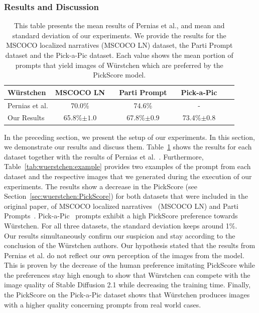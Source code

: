 \subsubsection{Results and Discussion}
\begin{table}[t]
    \caption{This table presents the mean results of Pernias et
        al.\cite{pernias2024wrstchen}, and mean and standard deviation of our
        experiments. We provide the results for the MSCOCO localized narratives
        (MSCOCO LN) dataset, the Parti Prompt dataset and the Pick-a-Pic
        dataset. Each value shows the mean portion of prompts that yield images
        of W\"urstchen which are preferred by the PickScore model.}
    \label{tab:wuerstchen:results}
    \centering
    \begin{tabular}{lccccccc}
        \toprule
        \textbf{W\"urstchen}                     & \textbf{MSCOCO LN}    & \phantom{0} & \textbf{Parti Prompt} & \phantom{0} & \textbf{Pick-a-Pic}   \\
        \midrule
        Pernias et al.\cite{pernias2024wrstchen} & 70.0\%                & \phantom{0} & 74.6\%                & \phantom{0} & -                     \\
        Our Results                              & 65.8\%{\tiny$\pm1.0$} & \phantom{0} & 67.8\%{\tiny$\pm0.9$} & \phantom{0} & 73.4\%{\tiny$\pm0.8$} \\
        \bottomrule
    \end{tabular}
\end{table}
In the preceding section, we present the setup of our experiments. In this
section, we demonstrate our results and discuss them.
Table~\ref{tab:wuerstchen:results} shows the results for each dataset together
with the results of Pernias et al.~\cite{pernias2024wrstchen}. Furthermore,
Table~\ref{tab:wuerstchen:example} provides two examples of the prompt from each
dataset and the respective images that we generated during the execution of our
experiments. The results show a decrease in the PickScore (see
Section~\ref{sec:wuerstchen:PickScore}) for both datasets that were included in
the original paper, of MSCOCO localized
narratives~\cite{PontTuset2020LocalizedNarratives} (MSCOCO LN) and Parti
Prompts~\cite{yu2022scalingautoregressivemodelscontentrich}.
Pick-a-Pic~\cite{kirstain2023pickapic} prompts exhibit a high PickScore
preference towards W\"urstchen. For all three datasets, the standard deviation
keeps around 1\%.\\

Our results simultaneously confirm our suspicion and stay according to the
conclusion of the W\"urstchen authors. Our hypothesis stated that the results
from Pernias et al. do not reflect our own perception of the images from the
model. This is proven by the decrease of the human preference imitating
PickScore while the preferences stay high enough to show that W\"urstchen can
compete with the image quality of Stable Diffusion 2.1 while decreasing the
training time. Finally, the PickScore on the Pick-a-Pic dataset shows that
W\"urstchen produces images with a higher quality concerning prompts from
real world cases.


